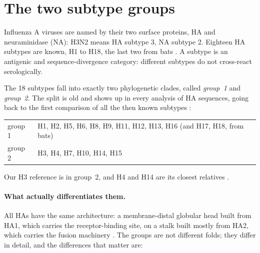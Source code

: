 \documentclass[11pt,a4paper]{article}
\begin{document}
\section{The two subtype groups}
\label{sec:groups}

Influenza A viruses are named by their two surface proteins, HA and
neuraminidase (NA): H3N2 means HA subtype 3, NA subtype 2. Eighteen HA subtypes
are known, H1 to H18, the last two from bats \cite{tong2013}. A subtype is an
antigenic and sequence-divergence category: different subtypes do not
cross-react serologically.

The 18 subtypes fall into exactly two phylogenetic clades, called
\emph{group~1} and \emph{group~2}. The split is old and shows up in every
analysis of HA sequences, going back to the first comparison of all the then
known subtypes \cite{air1981,nobusawa1991}:

\begin{center}
\begin{tabular}{@{}ll@{}}
\toprule
group 1 & H1, H2, H5, H6, H8, H9, H11, H12, H13, H16 (and H17, H18, from bats) \\
group 2 & H3, H4, H7, H10, H14, H15 \\
\bottomrule
\end{tabular}
\end{center}

\noindent
Our H3 reference is in group~2, and H4 and H14 are its closest relatives
\cite{air1981,nobusawa1991}.

\paragraph{What actually differentiates them.}
All HAs have the same architecture: a membrane-distal globular head built from
HA1, which carries the receptor-binding site, on a stalk built mostly from HA2,
which carries the fusion machinery \cite{wilson1981,skehel2000}. The groups are
not different folds; they differ in detail, and the differences that matter are:
\end{document}
